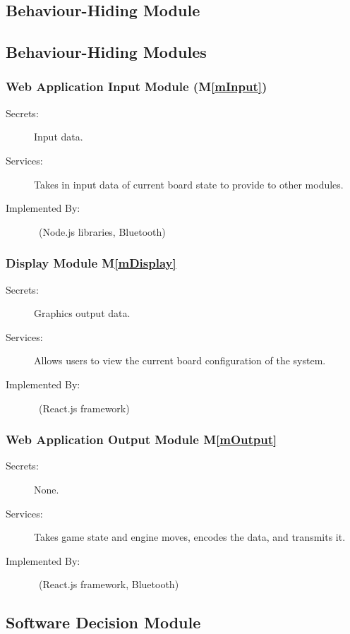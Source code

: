 \documentclass[12pt, titlepage]{article}
\newcommand{\mref}[1]{M\ref{#1}}
\begin{document}
\subsection{Behaviour-Hiding Module}
\subsection{Behaviour-Hiding Modules}
    \subsubsection{Web Application Input Module (\mref{mInput})}
    \begin{description}
    \item[Secrets:] Input data.
    \item[Services:] Takes in input data of current board state to provide to other modules.
    \item[Implemented By:] \progname\ (Node.js libraries, Bluetooth)
    \end{description}
    
    \subsubsection{Display Module \mref{mDisplay}} 
    \begin{description}
    \item[Secrets:] Graphics output data.
    \item[Services:] Allows users to view the current board configuration of the system.
    \item[Implemented By:] \progname\ (React.js framework)
    \end{description}

    \subsubsection{Web Application Output Module \mref{mOutput}} 
    \begin{description}
    \item[Secrets:] None.
    \item[Services:] Takes game state and engine moves, encodes the data, and transmits it.
    \item[Implemented By:] \progname\ (React.js framework, Bluetooth)
    \end{description}


\subsection{Software Decision Module}
\end{document}
